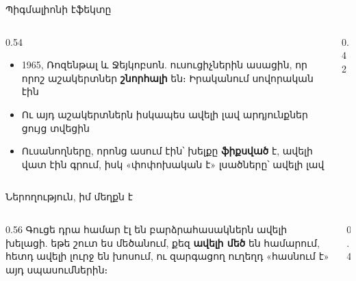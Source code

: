 \begin{frame}{Պիգմալիոնի էֆեկտը}
  \begin{columns}[T]
    \begin{column}{0.54\textwidth}
      \begin{itemize}
        \item 1965, Ռոզենթալ և Ջեյկոբսոն. ուսուցիչներին ասացին, որ որոշ աշակերտներ \textbf{շնորհալի} են։ Իրականում սովորական էին
        \item<2-> Ու այդ աշակերտներն իսկապես ավելի լավ արդյունքներ ցույց տվեցին
        \item<3-> Ուսանողները, որոնց ասում էին՝ խելքը \textbf{ֆիքսված} է, ավելի վատ էին գրում, իսկ «փոփոխական է» լսածները՝ ավելի լավ
      \end{itemize}
    \end{column}
    \begin{column}{0.42\textwidth}
    \end{column}
  \end{columns}
\end{frame}

\begin{frame}{Ներողություն, իմ մեղքն է}
  \begin{columns}[c]
    \begin{column}{0.56\textwidth}
      Գուցե դրա համար էլ են բարձրահասակներն ավելի խելացի. եթե շուտ ես մեծանում, քեզ \textbf{ավելի մեծ} են համարում, հետդ ավելի լուրջ են խոսում, ու զարգացող ուղեղդ «հասնում է» այդ սպասումներին։\par\medskip
    \end{column}
    \begin{column}{0.4\textwidth}
      \centering
    \end{column}
  \end{columns}
\end{frame}

